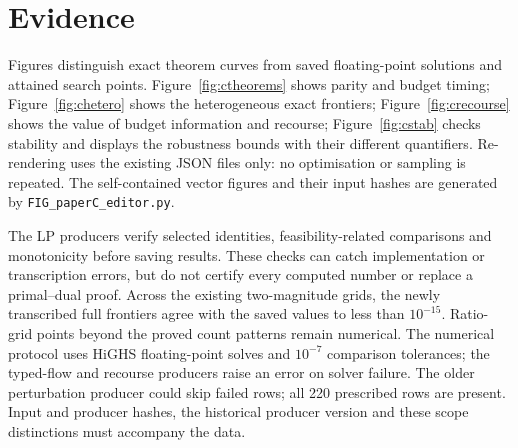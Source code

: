 \documentclass[conference]{IEEEtran}
\theoremstyle{definition}
\begin{document}
\section{Evidence}
\label{sec:evidence}

Figures distinguish exact theorem curves from saved floating-point solutions and attained
search points. Figure~\ref{fig:ctheorems} shows parity and budget timing;
Figure~\ref{fig:chetero} shows the heterogeneous exact frontiers;
Figure~\ref{fig:crecourse} shows the value of budget information and recourse;
Figure~\ref{fig:cstab} checks stability and displays the robustness bounds with their
different quantifiers. Re-rendering uses the existing JSON files only: no optimisation or
sampling is repeated. The self-contained vector figures and their input hashes are generated
by \texttt{FIG\_paperC\_editor.py}.

The LP producers verify selected identities, feasibility-related comparisons and monotonicity
before saving results. These checks can catch implementation or transcription errors, but
do not certify every computed number or replace a primal--dual proof. Across the existing
two-magnitude grids, the newly transcribed full frontiers agree with the saved values to
less than $10^{-15}$. Ratio-grid points beyond the proved count patterns remain numerical.
The numerical protocol uses HiGHS floating-point solves and $10^{-7}$ comparison tolerances;
the typed-flow and recourse producers raise an error on solver failure. The older perturbation
producer could skip failed rows; all 220 prescribed rows are present. Input and producer
hashes, the historical producer version and these scope distinctions must accompany the data.
\end{document}
